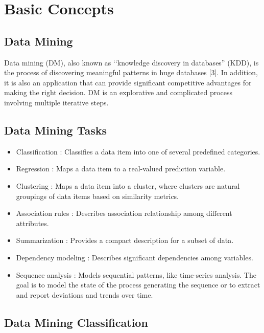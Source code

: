 \documentclass[a4paper,14pt,onecolumn]{article}
\begin{document}
\section{Basic Concepts}

\subsection{Data Mining}
                       Data mining (DM), also known as ‘‘knowledge discovery in databases” (KDD), is the process of discovering meaningful patterns in huge databases [3]. In addition, it is also an application that can provide significant competitive advantages for making the right decision.  DM is an explorative and complicated process involving multiple iterative steps.

\subsection{ Data Mining Tasks}
  \begin{itemize}
\item Classification              : Classifies a data item into one of several predefined categories.

\item Regression                 : Maps a data item to a real-valued prediction variable.

\item Clustering                  : Maps a data item into a cluster, where clusters are natural groupings of data items based on similarity metrics.

\item Association rules        : Describes association relationship among different attributes.

\item Summarization           : Provides a compact description for a subset of data.

\item Dependency modeling : Describes significant dependencies among variables.

\item Sequence analysis       : Models sequential patterns, like time-series analysis. The goal  is to model the state of the process generating the sequence or to extract and  report deviations and trends over time.
\end{itemize}

 \subsection{ Data Mining Classification}
\end{document}
